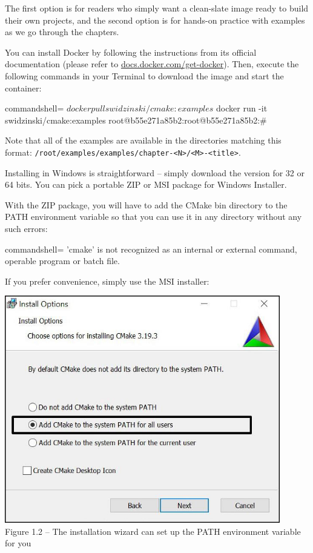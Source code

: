 The first option is for readers who simply want a clean-slate image ready to build their own projects, and the second option is for hands-on practice with examples as we go through the chapters.

You can install Docker by following the instructions from its official documentation (please refer to \url{docs.docker.com/get-docker}). Then, execute the following commands in your Terminal to download the image and start the container:

\begin{tcblisting}{commandshell={}}
$ docker pull swidzinski/cmake:examples
$ docker run -it swidzinski/cmake:examples
root@b55e271a85b2:root@b55e271a85b2:#
\end{tcblisting}

Note that all of the examples are available in the directories matching this format: \texttt{/root/examples/examples/chapter-<N>/<M>-<title>}.


Installing in Windows is straightforward – simply download the version for 32 or 64 bits. You can pick a portable ZIP or MSI package for Windows Installer.

With the ZIP package, you will have to add the CMake bin directory to the PATH environment variable so that you can use it in any directory without any such errors:

\begin{tcblisting}{commandshell={}}
'cmake' is not recognized as an internal or external command,
operable program or batch file.
\end{tcblisting}

If you prefer convenience, simply use the MSI installer:

\begin{center}
\includegraphics[width=0.9\textwidth]{content/1/chapter1/images/2.jpg}\\
Figure 1.2 – The installation wizard can set up the PATH environment variable for you
\end{center}

